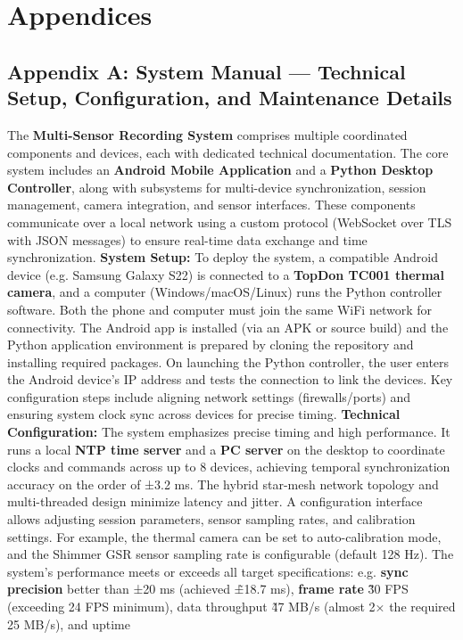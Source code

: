 \chapter{Appendices} \section{Appendix A: System Manual --- Technical Setup, Configuration, and Maintenance Details} The \textbf{Multi-Sensor Recording System} comprises multiple coordinated components and devices, each with dedicated technical documentation. The core system includes an \textbf{Android Mobile Application} and a \textbf{Python Desktop Controller}, along with subsystems for multi-device synchronization, session management, camera integration, and sensor interfaces. These components communicate over a local network using a custom protocol (WebSocket over TLS with JSON messages) to ensure real-time data exchange and time synchronization. \textbf{System Setup:} To deploy the system, a compatible Android device (e.g. Samsung Galaxy S22) is connected to a \textbf{TopDon TC001 thermal camera}, and a computer (Windows/macOS/Linux) runs the Python controller software. Both the phone and computer must join the same WiFi network for connectivity. The Android app is installed (via an APK or source build) and the Python application environment is prepared by cloning the repository and installing required packages. On launching the Python controller, the user enters the Android device's IP address and tests the connection to link the devices. Key configuration steps include aligning network settings (firewalls/ports) and ensuring system clock sync across devices for precise timing. \textbf{Technical Configuration:} The system emphasizes precise timing and high performance. It runs a local \textbf{NTP time server} and a \textbf{PC server} on the desktop to coordinate clocks and commands across up to 8 devices, achieving temporal synchronization accuracy on the order of ±3.2 ms. The hybrid star-mesh network topology and multi-threaded design minimize latency and jitter. A configuration interface allows adjusting session parameters, sensor sampling rates, and calibration settings. For example, the thermal camera can be set to auto-calibration mode, and the Shimmer GSR sensor sampling rate is configurable (default 128 Hz). The system's performance meets or exceeds all target specifications: e.g. \textbf{sync precision} better than ±20 ms (achieved \~±18.7 ms), \textbf{frame rate} \~30 FPS (exceeding 24 FPS minimum), data throughput \~47 MB/s (almost 2× the required 25 MB/s), and uptime %